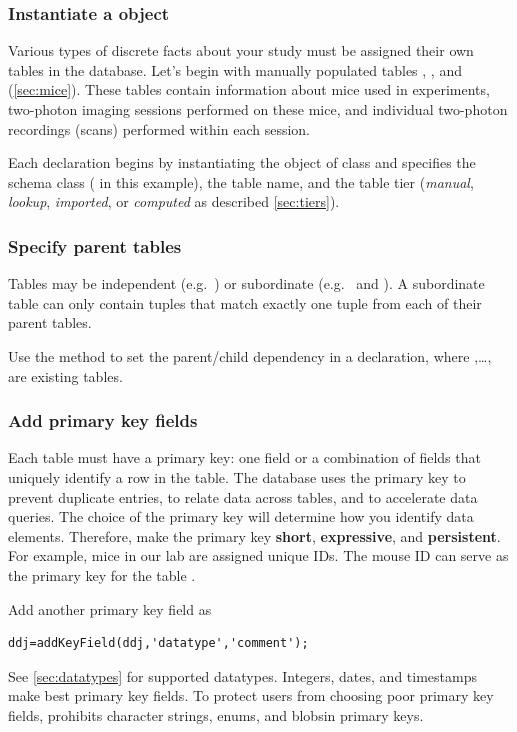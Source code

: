 \documentclass[10pt]{article}
\begin{document}
\subsubsection{Instantiate a  object}
Various types of discrete facts about your study must be assigned their own tables in the database. Let's begin with manually populated tables , , and  (\autoref{sec:mice}). These tables contain information about mice used in experiments, two-photon imaging sessions performed on these mice, and individual two-photon recordings (scans) performed within each session.  

Each declaration begins by instantiating the object  of class  and specifies the schema class ( in this example), the table name, and the table tier ({\em manual}, {\em lookup}, {\em imported}, or {\em computed} as described \autoref{sec:tiers}). 

\subsubsection{Specify parent tables}\label{sec:addParent}
Tables may be independent (e.g.~) or subordinate (e.g.~ and ). A subordinate table can only contain tuples that match exactly one tuple from each of their parent tables. 

Use the  method to set the parent/child dependency in a declaration, where ,\ldots, are existing tables.

\subsubsection{Add primary key fields}  Each table must have a primary key: one field or a combination of fields that uniquely identify a row in the table.  The database uses the primary key to prevent duplicate entries, to relate data across tables, and to accelerate data queries. The choice of the primary key will determine how you identify data elements. Therefore, make the primary key {\bf short}, {\bf expressive}, and {\bf persistent}.
For example, mice in our lab are assigned unique IDs. The mouse ID can serve as the primary key for the table . 

Add another primary key field as
\begin{lstlisting}
ddj=addKeyField(ddj,'datatype','comment');
\end{lstlisting}
See \autoref{sec:datatypes} for supported datatypes.  Integers, dates, and timestamps make best primary key fields. To protect users from choosing poor primary key fields,  prohibits character strings, enums, and blobsin primary keys.
\end{document}

